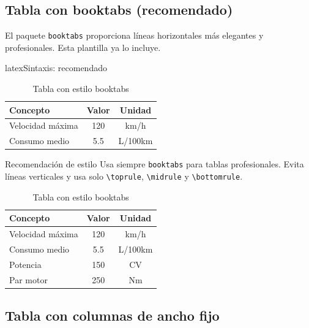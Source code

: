 \subsection{Tabla con booktabs (recomendado)}
\label{subsec:tabla-booktabs}

El paquete \texttt{booktabs} proporciona líneas horizontales más elegantes y profesionales. Esta plantilla ya lo incluye.

\begin{codigosimple}{latex}{Sintaxis: recomendado}
\begin{table}[htbp]
  \centering
  \caption{Tabla con estilo booktabs}
  \begin{tabular}{@{}lcc@{}}
    \toprule
    \textbf{Concepto} & \textbf{Valor} & \textbf{Unidad} \\
    \midrule
    Velocidad máxima & 120 & km/h \\
    Consumo medio & 5.5 & L/100km \\
    \bottomrule
  \end{tabular}
\end{table}
\end{codigosimple}

\begin{infobox}{Recomendación de estilo}
Usa siempre \texttt{booktabs} para tablas profesionales. Evita líneas verticales y usa solo \verb|\toprule|, \verb|\midrule| y \verb|\bottomrule|.
\end{infobox}

\begin{table}[htbp]
  \centering
  \caption{Tabla con estilo booktabs}
  \label{tab:booktabs}
  \EPScabeceraTabla
  \begin{tabular}{@{}lcc@{}}
    \toprule
    \textbf{Concepto} & \textbf{Valor} & \textbf{Unidad} \\
    \midrule
    Velocidad máxima & 120 & km/h \\
    Consumo medio & 5.5 & L/100km \\
    Potencia & 150 & CV \\
    Par motor & 250 & Nm \\
    \bottomrule
  \end{tabular}
\end{table}

\subsection{Tabla con columnas de ancho fijo}
\label{subsec:tabla-ancho-fijo}


